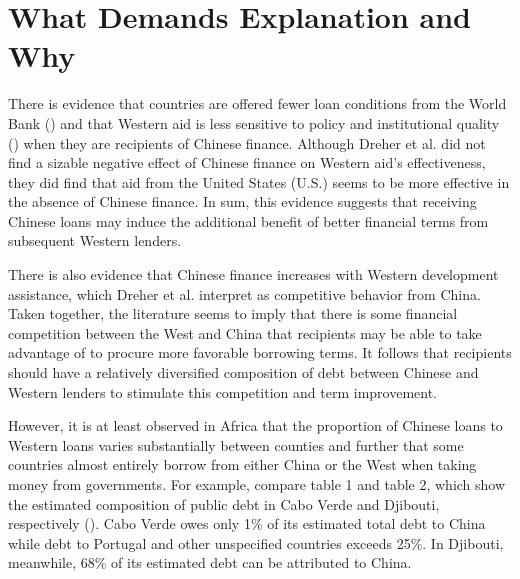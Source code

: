 \documentclass[12pt]{article}
\begin{document}
\section*{What Demands Explanation and Why}
There is evidence that countries are offered fewer loan conditions from the World Bank (\cite{hernandez2017}) and that Western aid is less sensitive to policy and institutional quality (\cite{annen2021}) when they are recipients of Chinese finance. Although Dreher et al. \citeyear{dreher2021} did not find a sizable negative effect of Chinese finance on Western aid's effectiveness, they did find that aid from the United States (U.S.) seems to be more effective in the absence of Chinese finance. In sum, this evidence suggests that receiving Chinese loans may induce the additional benefit of better financial terms from subsequent Western lenders.

There is also evidence that Chinese finance increases with Western development assistance, which Dreher et al. \citeyear{dreher2018} interpret as competitive behavior from China. Taken together, the literature seems to imply that there is some financial competition between the West and China that recipients may be able to take advantage of to procure more favorable borrowing terms. It follows that recipients should have a relatively diversified composition of debt between Chinese and Western lenders to stimulate this competition and term improvement.

However, it is at least observed in Africa that the proportion of Chinese loans to Western loans varies substantially between counties and further that some countries almost entirely borrow from either China or the West when taking money from governments. For example, compare table 1 and table 2, which show the estimated composition of public debt in Cabo Verde and Djibouti, respectively (\cite{jubileedebtcampaign2018}). Cabo Verde owes only 1\% of its estimated total debt to China while debt to Portugal and other unspecified countries exceeds 25\%. In Djibouti, meanwhile, 68\% of its estimated debt can be attributed to China.
\end{document}
